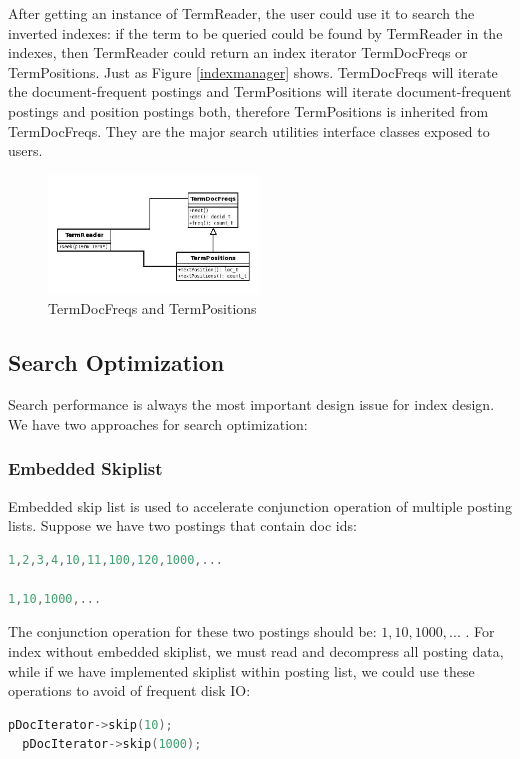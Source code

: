 \par
After getting an instance of TermReader, the user could use it to search the inverted indexes: if the term to be queried could be found by TermReader in the indexes, then TermReader could return an index iterator TermDocFreqs or TermPositions. Just as Figure \ref{indexmanager} shows. TermDocFreqs will iterate the document-frequent postings and TermPositions will iterate document-frequent postings and position postings both, therefore TermPositions is inherited from TermDocFreqs. They are the major search utilities interface classes exposed to users.\par

\begin{figure}[h!]
\centerline{\includegraphics[width=0.5\textwidth]{Figures/termPos.jpg}}
\caption{TermDocFreqs and TermPositions}\label{termPos}
\end{figure}


\subsection{Search Optimization}
Search performance is always the most important design issue for index design. We have two approaches for search optimization:

\subsubsection{Embedded Skiplist}
Embedded skip list is used to accelerate conjunction operation of multiple posting lists. Suppose we have two postings that contain doc ids:
\begin{lstlisting}[language=C]
1,2,3,4,10,11,100,120,1000,...

1,10,1000,...
\end{lstlisting}
The conjunction operation for these two postings should be: $1,10,1000,...$ . For index without embedded skiplist, we must read and decompress all posting data, while if we have implemented skiplist within posting list,
we could use these operations to avoid of frequent disk IO:
\begin{lstlisting}[language=C]
  pDocIterator->skip(10);
  pDocIterator->skip(1000);
\end{lstlisting}

